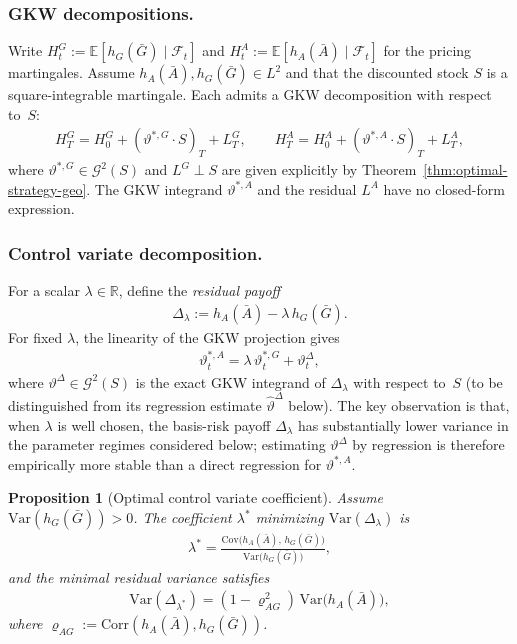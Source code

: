 \documentclass[10pt,a4paper,reqno]{amsart}
\theoremstyle{plain}
\newtheorem{proposition}[theorem]{Proposition}
\theoremstyle{definition}
\theoremstyle{remark}
\theoremstyle{example}
\begin{document}
\subsubsection*{GKW decompositions.}
Write $H_t^G:=\mathbb{E}[h_G(\bar G)\mid\mathcal{F}_t]$ and $H_t^A:=\mathbb{E}[h_A(\bar A)\mid\mathcal{F}_t]$ for the pricing martingales. Assume $h_A(\bar A),h_G(\bar G)\in L^2$ and that the discounted stock $S$ is a square-integrable martingale. Each admits a GKW decomposition with respect to~$S$:
\begin{align}\label{eq:GKW-A-G}
  H_T^G = H_0^G + (\vartheta^{*,G}\cdot S)_T + L_T^G,\qquad
  H_T^A = H_0^A + (\vartheta^{*,A}\cdot S)_T + L_T^A,
\end{align}
where $\vartheta^{*,G}\in \mathcal{G}^2(S)$ and $L^G\perp S$ are given explicitly by Theorem~\ref{thm:optimal-strategy-geo}. The GKW integrand $\vartheta^{*,A}$ and the residual $L^A$ have no closed-form expression.

\subsubsection*{Control variate decomposition.}
For a scalar $\lambda\in\mathbb{R}$, define the \emph{residual payoff}
\begin{align}\label{eq:Delta-payoff}
  \Delta_\lambda := h_A(\bar A) - \lambda\, h_G(\bar G).
\end{align}
For fixed $\lambda$, the linearity of the GKW projection gives
\begin{align}\label{eq:CV-hedge-decomposition}
  \vartheta^{*,A}_t = \lambda\,\vartheta^{*,G}_t + \vartheta^{\Delta}_t,
\end{align}
where $\vartheta^{\Delta}\in \mathcal{G}^2(S)$ is the exact GKW integrand of $\Delta_\lambda$ with respect to~$S$ (to be distinguished from its regression estimate $\hat\vartheta^{\Delta}$ below). The key observation is that, when $\lambda$ is well chosen, the basis-risk payoff $\Delta_\lambda$ has substantially lower variance in the parameter regimes considered below; estimating $\vartheta^{\Delta}$ by regression is therefore empirically more stable than a direct regression for $\vartheta^{*,A}$.

\begin{proposition}[Optimal control variate coefficient]\label{prop:optimal-lambda}
Assume $\mathrm{Var}(h_G(\bar G))>0$. The coefficient $\lambda^*$ minimizing $\mathrm{Var}(\Delta_\lambda)$ is
\begin{align}\label{eq:lambda-star}
  \lambda^* = \frac{\mathrm{Cov}\big(h_A(\bar A),\, h_G(\bar G)\big)}{\mathrm{Var}\big(h_G(\bar G)\big)},
\end{align}
and the minimal residual variance satisfies
\begin{align}\label{eq:residual-var}
  \mathrm{Var}(\Delta_{\lambda^*}) = (1-\varrho_{AG}^2)\,\mathrm{Var}\big(h_A(\bar A)\big),
\end{align}
where $\varrho_{AG}:=\mathrm{Corr}(h_A(\bar A),h_G(\bar G))$.
\end{proposition}
\end{document}
